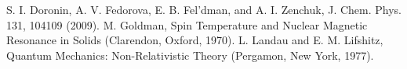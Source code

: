 \begin{thebibliography}{}
 S. I. Doronin, A. V. Fedorova, E. B. Fel’dman, and A. I. Zenchuk, J. Chem. Phys. 131, 104109 (2009).
 M. Goldman, Spin Temperature and Nuclear Magnetic Resonance in Solids (Clarendon, Oxford, 1970).
 L. Landau and E. M. Lifshitz, Quantum Mechanics: Non-Relativistic Theory (Pergamon, New York, 1977).




\end{thebibliography}
